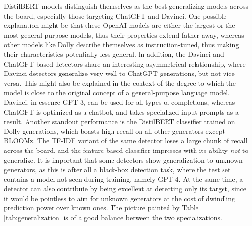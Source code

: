 DistilBERT models distinguish themselves as the best-generalizing models across the board, especially those targeting ChatGPT and Davinci.
One possible explanation might be that these OpenAI models are either the largest or the most general-purpose models, thus their properties extend father away, whereas other models like Dolly describe themselves as instruction-tuned, thus making their characteristics potentially less general.
In addition, the Davinci and ChatGPT-based detectors share an interesting asymmetrical relationship, where Davinci detectors generalize very well to ChatGPT generations, but not vice versa.
This might also be explained in the context of the degree to which the model is close to the original concept of a general-purpose language model.
Davinci, in essence GPT-3, can be used for all types of completions, whereas ChatGPT is optimized as a chatbot, and takes specialized input prompts as a result.
Another standout performance is the DistilBERT classifier trained on Dolly generations, which boasts high recall on all other generators except BLOOMz.
The TF-IDF variant of the same detector loses a large chunk of recall across the board, and the feature-based classifier impresses with its ability \emph{not} to generalize.
It is important that some detectors show generalization to unknown generators, as this is after all a black-box detection task, where the test set contains a model not seen during training, namely GPT-4.
At the same time, a detector can also contribute by being excellent at detecting only its target, since it would be pointless to aim for unknown generators at the cost of dwindling prediction power over known ones.
The picture painted by Table \ref{tab:generalization} is of a good balance between the two specializations.

